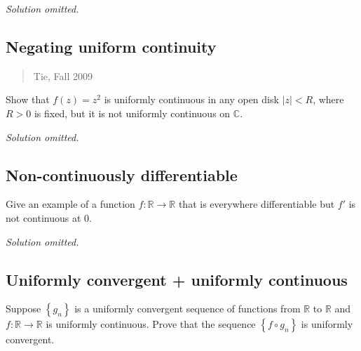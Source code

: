 \emph{Solution omitted.}

\hypertarget{negating-uniform-continuity}{%
\subsection{Negating uniform
continuity}\label{negating-uniform-continuity}}

\begin{quote}
Tie, Fall 2009
\end{quote}

\begin{problem}[?]

Show that \(f(z) = z^2\) is uniformly continuous in any open disk
\(|z| < R\), where \(R>0\) is fixed, but it is not uniformly continuous
on \(\mathbb C\).

\end{problem}

\emph{Solution omitted.}

\hypertarget{non-continuously-differentiable}{%
\subsection{Non-continuously
differentiable}\label{non-continuously-differentiable}}

\begin{problem}[?]

Give an example of a function \(f:{\mathbb{R}}\to {\mathbb{R}}\) that is
everywhere differentiable but \(f'\) is not continuous at 0.

\end{problem}

\emph{Solution omitted.}

\hypertarget{uniformly-convergent-uniformly-continuous}{%
\subsection{Uniformly convergent + uniformly
continuous}\label{uniformly-convergent-uniformly-continuous}}

\begin{problem}[?]

Suppose \(\left\{{g_n}\right\}\) is a uniformly convergent sequence of
functions from \({\mathbb{R}}\) to \({\mathbb{R}}\) and
\(f:{\mathbb{R}}\to {\mathbb{R}}\) is uniformly continuous. Prove that
the sequence \(\left\{{f\circ g_n}\right\}\) is uniformly convergent.

\end{problem}

